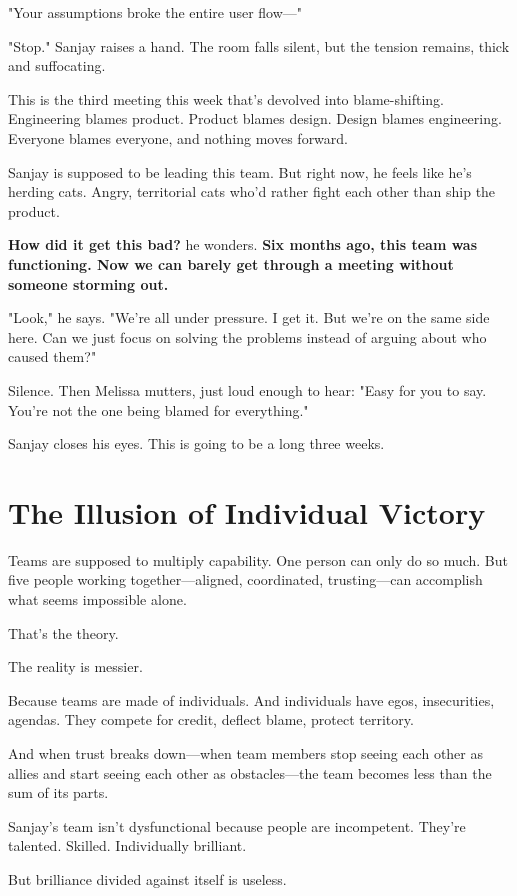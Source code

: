 \documentclass[11pt,twoside]{book}
\begin{document}
"Your assumptions broke the entire user flow—"

"Stop." Sanjay raises a hand. The room falls silent, but the tension remains, thick and suffocating.

This is the third meeting this week that's devolved into blame-shifting. Engineering blames product. Product blames design. Design blames engineering. Everyone blames everyone, and nothing moves forward.

Sanjay is supposed to be leading this team. But right now, he feels like he's herding cats. Angry, territorial cats who'd rather fight each other than ship the product.

\textbf{How did it get this bad?} he wonders. \textbf{Six months ago, this team was functioning. Now we can barely get through a meeting without someone storming out.}

"Look," he says. "We're all under pressure. I get it. But we're on the same side here. Can we just focus on solving the problems instead of arguing about who caused them?"

Silence. Then Melissa mutters, just loud enough to hear: "Easy for you to say. You're not the one being blamed for everything."

Sanjay closes his eyes. This is going to be a long three weeks.

\section*{The Illusion of Individual Victory}

Teams are supposed to multiply capability. One person can only do so much. But five people working together—aligned, coordinated, trusting—can accomplish what seems impossible alone.

That's the theory.

The reality is messier.

Because teams are made of individuals. And individuals have egos, insecurities, agendas. They compete for credit, deflect blame, protect territory.

And when trust breaks down—when team members stop seeing each other as allies and start seeing each other as obstacles—the team becomes less than the sum of its parts.

Sanjay's team isn't dysfunctional because people are incompetent. They're talented. Skilled. Individually brilliant.

But brilliance divided against itself is useless.
\end{document}
